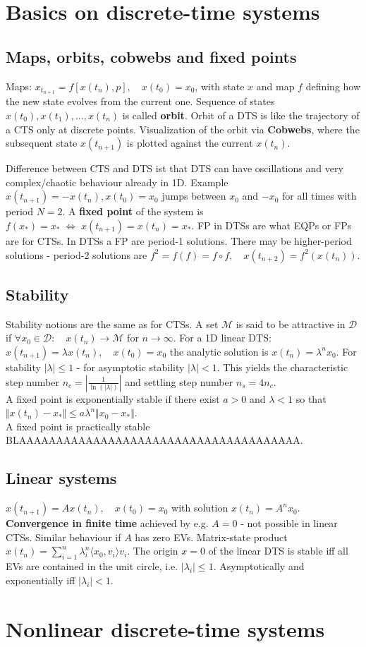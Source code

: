 \section{Basics on discrete-time systems}
\subsection{Maps, orbits, cobwebs and fixed points}
Maps: $x_{t_{n+1}}=f[x(t_n),p], \quad x(t_0)=x_0$, with state $x$ and map $f$ defining how the new state evolves from the current one. Sequence of states $x(t_0), x(t_1), ..., x(t_n)$ is called \textbf{orbit}. Orbit of a DTS is like the trajectory of a CTS only at discrete points. Visualization of the orbit via \textbf{Cobwebs}, where the subsequent state $x(t_{n+1})$ is plotted against the current $x(t_n)$.\vspace{0.1cm}

Difference between CTS and DTS ist that DTS can have oscillations and very complex/chaotic behaviour already in 1D. Example $x(t_{n+1})=-x(t_n), x(t_0)=x_0$ jumps between $x_0$ and $-x_0$ for all times with period $N=2$. A \textbf{fixed point} of the system is $f(x_*)=x_* \; \Leftrightarrow \; x(t_{n+1}) = x(t_n) = x_*$. FP in DTSs are what EQPs or FPs are for CTSs. In DTSs a FP are period-1 solutions. There may be higher-period solutions - period-2 solutions are $f^2 = f(f) = f \circ f, \quad x(t_{n+2})=f^2(x(t_n))$.

\subsection{Stability}
Stability notions are the same as for CTSs.
A set $\mathcal{M}$ is said to be attractive in $\mathcal{D}$ if $\forall x_0 \in \mathcal{D}: \quad x(t_n) \rightarrow \mathcal{M}$ for $n\rightarrow \infty$. For a 1D linear DTS: $x(t_{n+1})=\lambda x(t_n), \quad x(t_0)=x_0$ the analytic solution is $x(t_n)=\lambda^n x_0$. For stability $|\lambda|\leq 1$ - for asymptotic stability $|\lambda|<1$. This yields the characteristic step number $n_c=\left|\frac{1}{\ln(|\lambda|)}\right|$ and settling step number $n_s=4n_c$.\\
A fixed point is exponentially stable if there exist $a>0$ and $\lambda<1$ so that $\Vert x(t_n)-x_*\Vert \leq a\lambda^n\Vert x_0 - x_* \Vert$.\\
A fixed point is practically stable BLAAAAAAAAAAAAAAAAAAAAAAAAAAAAAAAAAAAAAA.\\

\subsection{Linear systems}
$x(t_{n+1})=Ax(t_n), \quad x(t_0)=x_0$ with solution $x(t_n)=A^nx_0$. \textbf{Convergence in finite time} achieved by e.g. $A=0$ - not possible in linear CTSs. Similar behaviour if $A$ has zero EVs. Matrix-state product $x(t_n)=\sum_{i=1}^n \lambda_i^n \langle x_0, v_i \rangle v_i$. The origin $x=0$ of the linear DTS is stable iff all EVs are contained in the unit circle, i.e. $|\lambda_i| \leq 1$. Asymptotically and exponentially iff $|\lambda_i|<1$.


\section{Nonlinear discrete-time systems}
